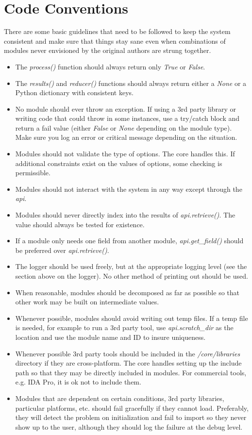 \documentclass{book}
\begin{document}
\section{Code Conventions}
There are some basic guidelines that need to be followed to keep the system consistent and make sure that things stay sane even when combinations of modules never envisioned by the original authors are strung together.
\begin{itemize}
	\item The \emph{process()} function should always return only \emph{True} or \emph{False}.
	\item The \emph{results()} and \emph{reducer()} functions should always return either a \emph{None} or a Python dictionary with consistent keys.
	\item No module should ever throw an exception.  If using a 3rd party library or writing code that could throw in some instances, use a try/catch block and return a fail value (either \emph{False} or \emph{None} depending on the module type).  Make sure you log an error or critical message depending on the situation.
	\item Modules should not validate the type of options.  The core handles this.  If additional constraints exist on the values of options, some checking is permissible.
	\item Modules should not interact with the system in any way except through the \emph{api}.
	\item Modules should never directly index into the results of \emph{api.retrieve()}.  The value should always be tested for existence.
	\item If a module only needs one field from another module, \emph{api.get\_field()} should be preferred over \emph{api.retrieve()}.
	\item The logger should be used freely, but at the appropriate logging level (see the section above on the logger).  No other method of printing out should be used.
	\item When reasonable, modules should be decomposed as far as possible so that other work may be built on intermediate values.
	\item Whenever possible, modules should avoid writing out temp files.  If a temp file is needed, for example to run a 3rd party tool, use \emph{api.scratch\_dir} as the location and use the module name and ID to insure uniqueness.
	\item Whenever possible 3rd party tools should be included in the \emph{/core/libraries} directory if they are cross-platform.  The core handles setting up the include path so that they may be directly included in modules.  For commercial tools, e.g. IDA Pro, it is ok not to include them.
	\item Modules that are dependent on certain conditions, 3rd party libraries, particular platforms, etc. should fail gracefully if they cannot load.  Preferably, they will detect the problem on initialization and fail to import so they never show up to the user, although they should log the failure at the debug level.
\end{itemize}
\end{document}
